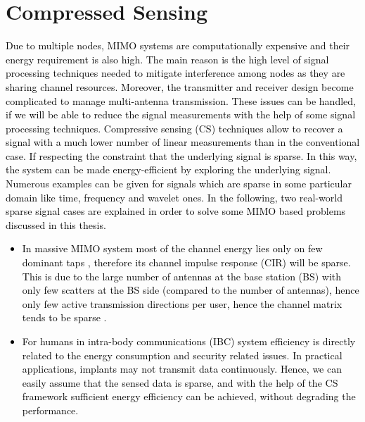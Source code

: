 \section{Compressed Sensing}
\textcolor{black}{Due to multiple nodes, MIMO systems are computationally expensive and their energy requirement is also high. The main reason \textcolor{black}{is the }high level of signal processing techniques \textcolor{black}{needed }to mitigate interference among nodes as they are sharing channel resources. \textcolor{black}{Moreover,} the transmitter and receiver design become complicated to manage multi-antenna transmission. \textcolor{black}{These issues} can be handled, if we will be able to reduce the \textcolor{black}{signal }measurements with the help of some signal processing techniques. Compressive sensing (CS)  techniques \textcolor{black}{allow to } recover \textcolor{black}{a} signal with a much lower number of linear measurements than in the conventional case. \textcolor{black}{If respecting} the constraint that the underlying signal is sparse. \textcolor{black}{In this way},  the system can be made energy-efficient \textcolor{black}{by exploring the} underlying signal. Numerous examples can be given for signals which are sparse in some \textcolor{black}{particular domain like} time, frequency \textcolor{black}{and wavelet ones.} In the following, two real-world sparse signal cases are explained \textcolor{black}{in order to solve} some MIMO based problems \textcolor{black}{discussed in this thesis}.
\begin{itemize}
    \item \textcolor{black}{In} massive MIMO \textcolor{black}{system }most of the channel energy lies only on few dominant taps \cite{sparse_channel}, therefore its channel impulse response (CIR) will be sparse. This is due to the large number of antennas at the base station (BS) with only few scatters at the BS side (compared to the number of antennas), hence only  few active transmission directions per user, hence the channel matrix tends to be sparse \cite{mainref-joint,exp-vitual}.
\item \textcolor{black}{For} humans in intra-body communications (IBC) system efficiency is directly related to the energy \textcolor{black}{consumption} and security related issues.
In practical applications, implants may not transmit data
continuously. Hence, we can easily assume that the sensed data is sparse, and with the help of the CS framework sufficient energy efficiency can be achieved, without degrading the performance.
\end{itemize}
}
